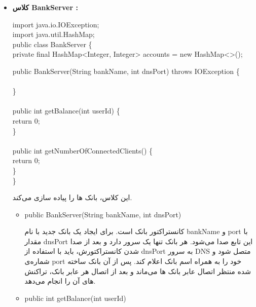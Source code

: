 \documentclass[]{article}
\newcommand\tab[1][1cm]{\hspace*{#1}}
\begin{document}
\begin{itemize}
\item \textbf{کلاس BankServer :}\\
\begin{tcolorbox}[boxrule=0pt]
	\begin{latin}
  	  \large{
import java.io.IOException;\\
import java.util.HashMap;\\

public class BankServer \{\\
\tab    private final HashMap<Integer, Integer> accounts = new HashMap<>();

\tab    public BankServer(String bankName, int dnsPort) throws IOException \{\\\\
\tab    \}
\\\\
\tab    public int getBalance(int userId) \{\\
\tab    \tab    return 0;\\
\tab    \}\\
\\
\tab    public int getNumberOfConnectedClients() \{\\
\tab   \tab     return 0;\\
\tab    \}\\
\}
		}
	\end{latin}
\end{tcolorbox}
این کلاس، بانک ها را پیاده‌ سازی می‌کند.
\begin{itemize}[label = {}]
\item	
\begin{tcolorbox}[boxrule=0pt]
	\begin{latin}
  	  \large{
  	  	public BankServer(String bankName, int dnsPort)
		}
	\end{latin}
\end{tcolorbox}

کانستراکتور بانک است. برای ایجاد یک بانک جدید با نام bankName و port با مقدار dnsPort این تابع صدا می‌شود. هر بانک تنها یک سرور دارد و بعد از صدا شدن کانستراکتورش، باید با استفاده از dnsPort به سرور DNS متصل شود و شماره‌ی ‌port خود را به همراه اسم بانک اعلام کند. پس از آن بانک ساخته شده منتظر اتصال عابر بانک ها می‌ماند و بعد از اتصال هر عابر بانک، تراکنش های آن را انجام می‌دهد.

\item	
\begin{tcolorbox}[boxrule=0pt]
	\begin{latin}
  	  \large{
  	  	public int getBalance(int userId)
		}
	\end{latin}
\end{tcolorbox}


\end{itemize}
\end{itemize}
\end{document}
